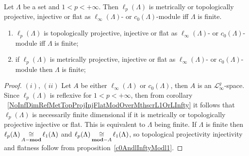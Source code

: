 \begin{proposition}\label{c0AndlInftyModlp} Let $\Lambda$ be a set and
$1<p<+\infty$. Then $\ell_p(\Lambda)$ is metrically or topologically projective,
injective or flat as $\ell_\infty(\Lambda)$- or $c_0(\Lambda)$-module iff
$\Lambda$ is finite.

\begin{enumerate}[label = (\roman*)]
    \item $\ell_p(\Lambda)$ is topologically projective,
    injective or flat as $\ell_\infty(\Lambda)$- or $c_0(\Lambda)$-module iff
    $\Lambda$ is finite;

    \item if $\ell_p(\Lambda)$ is metrically projective,
    injective or flat as $\ell_\infty(\Lambda)$- or $c_0(\Lambda)$-module then
    $\Lambda$ is finite;
\end{enumerate}
\end{proposition}
\begin{proof} $(i)$, $(ii)$ Let $A$ be either $\ell_\infty(\Lambda)$ 
or $c_0(\Lambda)$, then $A$ is an $\mathscr{L}_\infty^g$-space. 
Since $\ell_p(\Lambda)$ is reflexive for $1<p<+\infty$, then from corollary
~\ref{NoInfDimRefMetTopProjInjFlatModOverMthscrL1OrLInfty} it follows that
$\ell_p(\Lambda)$ is necessarily finite dimensional if it is metrically or
topologically projective injective or flat. This is equivalent to $\Lambda$
being finite. If $\Lambda$ is finite then
$\ell_p(\Lambda)\mathop{\mathbin{\cong}}\limits_{A-\mathbf{mod}}\ell_1(\Lambda)$ and
$\ell_p(\Lambda)\mathop{\mathbin{\cong}}\limits_{\mathbf{mod}-A}\ell_1(\Lambda)$, so topological
projectivity injectivity and flatness follow from
proposition~\ref{c0AndlInftyModl1}.
\end{proof}

